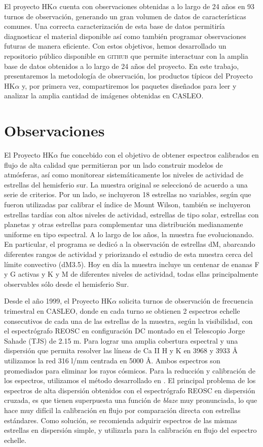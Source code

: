 \documentclass[baaa]{baaa}
\begin{document}
El proyecto HK$\alpha$ cuenta con observaciones obtenidas a lo largo de 24 años en 93 turnos de observación, generando un gran volumen de datos de características comunes. Una correcta caracterización de esta base de datos permitiría diagnosticar el material disponible así como también programar observaciones futuras de manera eficiente.
Con estos objetivos, hemos desarrollado un repositorio público disponible en \textsc{github} que permite interactuar con la amplia base de datos obtenidos a lo largo de 24 años del proyecto.  En este trabajo, presentaremos la metodología de observación, los productos típicos del Proyecto HK$\alpha$ y, por primera vez,   compartiremos los paquetes diseñados  para leer y analizar la amplia cantidad de imágenes obtenidas en CASLEO.


\section{Observaciones}
El Proyecto HK$\alpha$ fue concebido con el objetivo de obtener espectros calibrados en flujo de alta calidad que permitieran por un lado construir modelos de atmósferas, así como monitorear sistemáticamente los niveles de actividad de estrellas del hemisferio sur.  La muestra original se seleccionó de acuerdo a una serie de criterios. Por un lado, se incluyeron 18 estrellas no variables, según \cite{1996AJ....111..439H} que fueron utilizadas par calibrar el índice de Mount Wilson, también se incluyeron estrellas tardías con altos niveles de actividad, estrellas de tipo solar, estrellas con planetas y otras estrellas para complementar una distribución medianamente uniforme en tipo espectral. A lo largo de los años, la muestra fue evolucionando. En particular, el programa se dedicó a la observación de  estrellas dM, abarcando diferentes rangos de actividad y priorizando el estudio de esta muestra cerca del límite convectivo (dM3.5). Hoy en día la muestra incluye un centenar de enanas F y G activas y K y M de diferentes niveles de actividad, todas ellas principalmente observables sólo desde el hemisferio Sur.

Desde el año 1999,  el Proyecto HK$\alpha$ solicita turnos de observación de frecuencia trimestral en CASLEO, donde en cada turno se obtienen 2 espectros echelle consecutivos de cada una de las estrellas de la muestra, según la visibilidad, con el espectrógrafo REOSC en configuración DC montado en el Telescopio Jorge Sahade (TJS) de 2.15 m. Para lograr una amplia cobertura espectral y una dispersión que permita resolver las líneas de Ca \scriptsize{II}\normalsize\- H y K en 3968 y 3933 \AA\- utilizamos la red 316 l/mm centrada en 5000 \AA.
Ambos espectros son promediados para eliminar los rayos cósmicos. Para la reducción y calibración de los espectros, utilizamos el método desarrollado en \citep{2004A&A...414..699C}. El principal problema de los espectros de alta dispersión obtenidos con el espectrógrafo REOSC en dispersión cruzada, es que tienen superpuesta una función de \emph{blaze} muy pronunciada, lo que hace muy difícil la calibración en flujo por comparación directa con estrellas estándares. Como solución, se recomienda adquirir espectros de las mismas estrellas en dispersión simple, y utilizarla para la calibración en flujo del espectro echelle.
\end{document}
